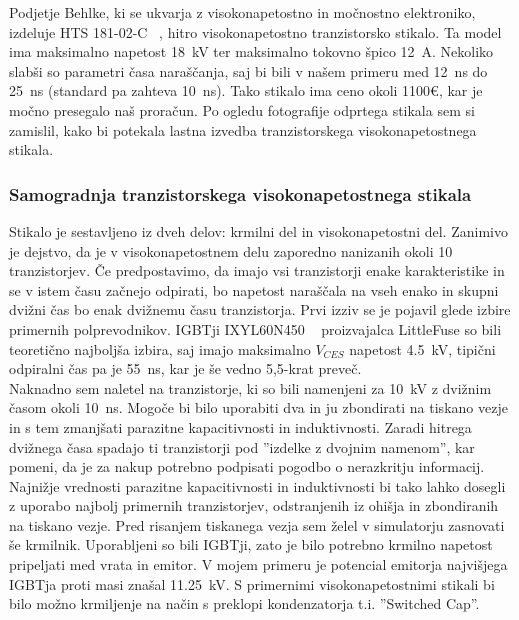 \documentclass[a4paper,twoside,openright,12pt,Slovene]{book}
\begin{document}
	Podjetje Behlke, ki se ukvarja z visokonapetostno in močnostno elektroniko, izdeluje HTS 181-02-C ~\cite{Behlke:HTS181-02-C}, hitro visokonapetostno tranzistorsko stikalo. Ta model ima maksimalno napetost \SI{18}{\kilo\volt} ter maksimalno tokovno špico \SI{12}{\ampere}. Nekoliko slabši so parametri časa naraščanja, saj bi bili v našem primeru med \SI{12}{\nano\second} do \SI{25}{\nano\second} (standard pa zahteva \SI{10}{\nano\second}). Tako stikalo ima ceno okoli 1100\euro , kar je močno presegalo naš proračun. Po ogledu fotografije odprtega stikala sem si zamislil, kako bi potekala lastna izvedba tranzistorskega visokonapetostnega stikala.
	
	\subsubsection{Samogradnja tranzistorskega visokonapetostnega stikala} \label{Samogradnja tranzistorskega visokonapetostnega stikala}
	
	Stikalo je sestavljeno iz dveh delov: krmilni del in visokonapetostni del. Zanimivo je dejstvo, da je v visokonapetostnem delu zaporedno nanizanih okoli 10 tranzistorjev. Če predpostavimo, da imajo vsi tranzistorji enake karakteristike in se v istem času začnejo odpirati, bo napetost naraščala na vseh enako in skupni dvižni čas bo enak dvižnemu času tranzistorja. Prvi izziv se je pojavil glede izbire primernih polprevodnikov. IGBTji IXYL60N450 ~\cite{IXYS:IXYL60N450} proizvajalca LittleFuse so bili teoretično najboljša izbira, saj imajo maksimalno \(V_{CES}\) napetost \SI{4,5}{\kilo\volt}, tipični odpiralni čas pa je \SI{55}{\nano\second}, kar je še vedno 5,5-krat preveč. 
    ~\\Naknadno sem naletel na tranzistorje, ki so bili namenjeni za \SI{10}{\kilo\volt} z dvižnim časom okoli \SI{10}{\nano\second}. Mogoče bi bilo uporabiti dva in ju zbondirati na tiskano vezje in s tem zmanjšati parazitne kapacitivnosti in induktivnosti. Zaradi hitrega dvižnega časa spadajo ti tranzistorji pod ''izdelke z dvojnim namenom'', kar pomeni, da je za nakup potrebno podpisati pogodbo o nerazkritju informacij. Najnižje vrednosti parazitne kapacitivnosti in induktivnosti bi tako lahko dosegli z uporabo najbolj primernih tranzistorjev, odstranjenih iz ohišja in zbondiranih na tiskano vezje. Pred risanjem tiskanega vezja sem želel v simulatorju zasnovati še krmilnik. Uporabljeni so bili IGBTji, zato je bilo potrebno krmilno napetost pripeljati med vrata in emitor. V mojem primeru je potencial emitorja najvišjega IGBTja proti masi znašal \SI{11,25}{\kilo\volt}. S primernimi visokonapetostnimi stikali bi bilo možno krmiljenje na način s preklopi kondenzatorja t.i. ''Switched Cap''.
\end{document}
